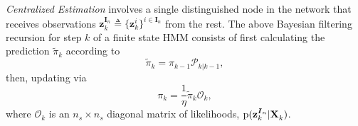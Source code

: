 \documentclass[conference]{IEEEtran}
\theoremstyle{remark}
\newcommand{\XX}[3][2]{\mathbf{X}_{\tiny #2}^{\tiny #3}}
\newcommand{\pr}{\textrm{p}}
\newcommand{\bIn}{\boldsymbol{I}_{{n}}}
\newcommand{\zz}[3][2]{\mathbf{z}_{ #2}^{ #3}}
\begin{document}
\emph{Centralized Estimation} involves a single distinguished node in the network that receives observations $\zz{k}{\bIn} \triangleq \{\zz{k}{i}\}^{i\in\bIn}$ from the rest. The above Bayesian filtering recursion for step $k$ of a finite state HMM consists of first calculating the prediction $\tilde{\pi}_{k}$ according to 
 \begin{equation}
 \label{eq:pred}
 \tilde{\pi}_{k} =  \pi_{k-1}\mathcal{P}_{k \vert k-1},
 \end{equation}
 then, updating via
   \begin{equation}
    \label{eq:update}
   {\pi}_{k} = \frac{1}{\eta}\tilde{\pi}_{k} \mathcal{O}_k,
   \end{equation}
where $\mathcal{O}_k$ is an $n_s\times n_s$ diagonal matrix of likelihoods, $\pr(\zz{k}{\bIn}| \XX[]{k}{})$.  
\end{document}
